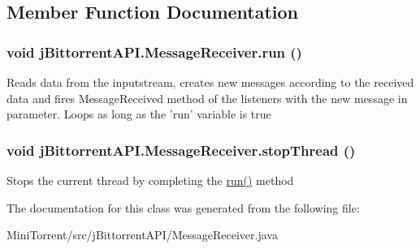 \subsection{Member Function Documentation}
\hypertarget{classj_bittorrent_a_p_i_1_1_message_receiver_ac443b2bb4923cc0dc786624c2c8110be}{
\subsubsection[{run}]{\setlength{\rightskip}{0pt plus 5cm}void jBittorrentAPI.MessageReceiver.run ()}}
\label{classj_bittorrent_a_p_i_1_1_message_receiver_ac443b2bb4923cc0dc786624c2c8110be}
Reads data from the inputstream, creates new messages according to the received data and fires MessageReceived method of the listeners with the new message in parameter. Loops as long as the 'run' variable is true \hypertarget{classj_bittorrent_a_p_i_1_1_message_receiver_a88af317cab076caf36203622d169d95d}{
\subsubsection[{stopThread}]{\setlength{\rightskip}{0pt plus 5cm}void jBittorrentAPI.MessageReceiver.stopThread ()}}
\label{classj_bittorrent_a_p_i_1_1_message_receiver_a88af317cab076caf36203622d169d95d}
Stops the current thread by completing the \hyperlink{classj_bittorrent_a_p_i_1_1_message_receiver_ac443b2bb4923cc0dc786624c2c8110be}{run()} method 

The documentation for this class was generated from the following file:\begin{DoxyCompactItemize}
\item 
MiniTorrent/src/jBittorrentAPI/MessageReceiver.java\end{DoxyCompactItemize}
